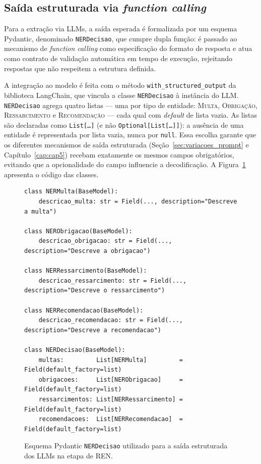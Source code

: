 \subsection{Saída estruturada via \textit{function calling}}
\label{sec:saida_estruturada}

Para a extração via LLMs, a saída esperada é formalizada por um esquema Pydantic, denominado \texttt{NERDecisao}, que cumpre dupla função: é passado ao mecanismo de \textit{function calling} como especificação do formato de resposta e atua como contrato de validação automática em tempo de execução, rejeitando respostas que não respeitem a estrutura definida.

A integração ao modelo é feita com o método \texttt{with\_structured\_output} da biblioteca LangChain, que vincula a classe \texttt{NERDecisao} à instância do LLM. \texttt{NERDecisao} agrega quatro listas --- uma por tipo de entidade: \textsc{Multa}, \textsc{Obrigação}, \textsc{Ressarcimento} e \textsc{Recomendação} --- cada qual com \textit{default} de lista vazia. As listas são declaradas como \texttt{List[\ldots]} (e não \texttt{Optional[List[\ldots]]}): a ausência de uma entidade é representada por lista vazia, nunca por \texttt{null}. Essa escolha garante que os diferentes mecanismos de saída estruturada (Seção~\ref{sec:variacoes_prompt} e Capítulo~\ref{cap:cap5}) recebam exatamente os mesmos campos obrigatórios, evitando que a opcionalidade do campo influencie a decodificação. A Figura~\ref{fig:pydantic_ner} apresenta o código das classes.

\begin{figure}[htbp]
\centering
\begin{minipage}{0.95\linewidth}
\begin{footnotesize}
\begin{verbatim}
class NERMulta(BaseModel):
    descricao_multa: str = Field(..., description="Descreve a multa")

class NERObrigacao(BaseModel):
    descricao_obrigacao: str = Field(..., description="Descreve a obrigacao")

class NERRessarcimento(BaseModel):
    descricao_ressarcimento: str = Field(..., description="Descreve o ressarcimento")

class NERRecomendacao(BaseModel):
    descricao_recomendacao: str = Field(..., description="Descreve a recomendacao")

class NERDecisao(BaseModel):
    multas:         List[NERMulta]         = Field(default_factory=list)
    obrigacoes:     List[NERObrigacao]     = Field(default_factory=list)
    ressarcimentos: List[NERRessarcimento] = Field(default_factory=list)
    recomendacoes:  List[NERRecomendacao]  = Field(default_factory=list)
\end{verbatim}
\end{footnotesize}
\end{minipage}
\caption{Esquema Pydantic \texttt{NERDecisao} utilizado para a saída estruturada dos LLMs na etapa de REN.}
\label{fig:pydantic_ner}
\end{figure}

